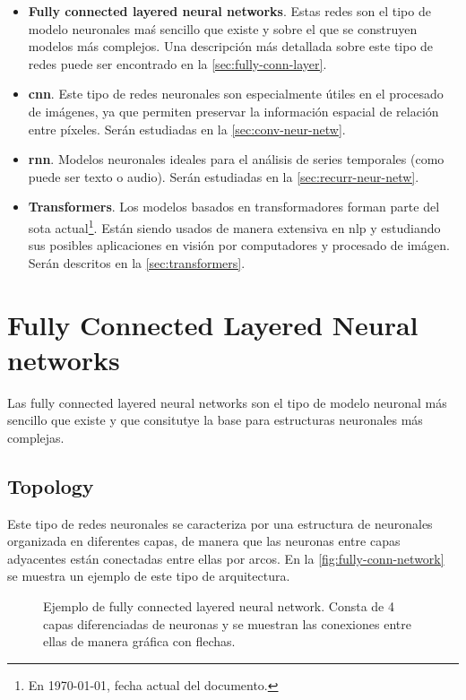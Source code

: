 \begin{itemize}
  \item \textbf{Fully connected layered neural networks}. Estas redes son el
  tipo de modelo neuronales maś sencillo que existe y sobre el que se
  construyen modelos más complejos. Una descripción más detallada sobre este
  tipo de redes puede ser encontrado en la \vref{sec:fully-conn-layer}.
  \item \textbf{\acl*{cnn}}. Este tipo de redes neuronales son especialmente
  útiles en el procesado de imágenes, ya que permiten preservar la información
  espacial de relación entre píxeles. Serán estudiadas en la
  \vref{sec:conv-neur-netw}.
  \item \textbf{\acl*{rnn}}. Modelos neuronales ideales para el análisis de
  series temporales (como puede ser texto o audio). Serán estudiadas en la
  \vref{sec:recurr-neur-netw}.
  \item \textbf{Transformers}. Los modelos basados en transformadores forman
  parte del \acl{sota} actual\footnote{En \today, fecha actual del
    documento.}. Están siendo usados de manera extensiva en \gls{nlp} y
  estudiando sus posibles aplicaciones en visión por computadores y procesado
  de imágen. Serán descritos en la \vref{sec:transformers}.
\end{itemize}


\section{Fully Connected Layered Neural networks}
\label{sec:fully-conn-layer}

Las fully connected layered neural networks son el tipo de modelo neuronal más
sencillo que existe y que consitutye la base para estructuras neuronales más
complejas.

\subsection{Topology}
\label{sec:topology}

Este tipo de redes neuronales se caracteriza por una estructura de neuronales
organizada en diferentes capas, de manera que las neuronas entre capas
adyacentes están conectadas entre ellas por arcos. En la
\vref{fig:fully-conn-network} se muestra un ejemplo de este tipo de
arquitectura.

\begin{figure}[ht]
  \centering
  
  \caption[Fully Connected Neural Network topology]{Ejemplo de fully connected
    layered neural network. Consta de 4 capas diferenciadas de neuronas y se
    muestran las conexiones entre ellas de manera gráfica con flechas.}
  \label{fig:fully-conn-network}
\end{figure}

